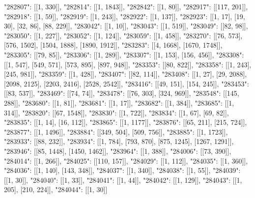 { "282807": [[1, 330]],
 "282814": [[1, 1843]],
 "282842": [[1, 80]],
 "282917": [[117, 201]],
 "282918": [[1, 59]],
 "282919": [[1, 243]],
 "282922": [[1, 137]],
 "282923": [[1, 17], [19, 30], [32, 86], [88, 229]],
 "283042": [[1, 10]],
 "283043": [[1, 519]],
 "283049": [[82, 98]],
 "283050": [[1, 227]],
 "283052": [[1, 124]],
 "283059": [[1, 458]],
 "283270": [[76, 573], [576, 1502], [1504, 1888], [1890, 1912]],
 "283283": [[4, 1668], [1670, 1748]],
 "283305": [[79, 85]],
 "283306": [[1, 289]],
 "283307": [[1, 153], [156, 456]],
 "283308": [[1, 547], [549, 571], [573, 895], [897, 948]],
 "283353": [[80, 822]],
 "283358": [[1, 243], [245, 981]],
 "283359": [[1, 428]],
 "283407": [[82, 114]],
 "283408": [[1, 27], [29, 2088], [2098, 2125], [2203, 2416], [2528, 2542]],
 "283416": [[49, 151], [154, 245]],
 "283453": [[83, 537]],
 "283469": [[74, 74]],
 "283478": [[76, 303], [324, 969]],
 "283548": [[145, 288]],
 "283680": [[1, 81]],
 "283681": [[1, 17]],
 "283682": [[1, 384]],
 "283685": [[1, 314]],
 "283820": [[67, 1548]],
 "283830": [[1, 722]],
 "283834": [[1, 67], [69, 82]],
 "283835": [[1, 14], [16, 112]],
 "283865": [[1, 1177]],
 "283876": [[65, 211], [215, 724]],
 "283877": [[1, 1496]],
 "283884": [[349, 504], [509, 756]],
 "283885": [[1, 1723]],
 "283933": [[88, 232]],
 "283934": [[1, 784], [793, 870], [875, 1245], [1267, 1291]],
 "283946": [[85, 1448], [1450, 1462]],
 "283964": [[1, 388]],
 "284006": [[73, 390]],
 "284014": [[1, 266]],
 "284025": [[110, 157]],
 "284029": [[1, 112]],
 "284035": [[1, 360]],
 "284036": [[1, 140], [143, 348]],
 "284037": [[1, 340]],
 "284038": [[1, 55]],
 "284039": [[1, 30]],
 "284040": [[1, 33]],
 "284041": [[1, 44]],
 "284042": [[1, 129]],
 "284043": [[1, 205], [210, 224]],
 "284044": [[1, 30]]}
